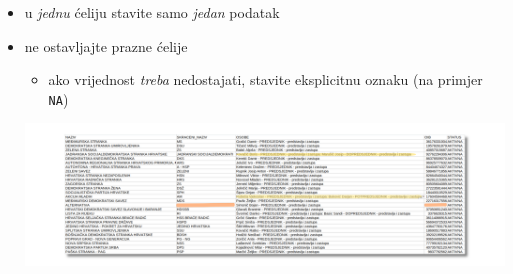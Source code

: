 \documentclass[handout,aspectratio=169]{beamer}
\begin{document}
\begin{frame}
    \begin{itemize}
        \setlength{\itemsep}{2em}

        \item u \textit{jednu} ćeliju stavite samo \textit{jedan} podatak

        \item ne ostavljajte prazne ćelije

            \begin{itemize}
                \item ako vrijednost \textit{treba} nedostajati, stavite
                    eksplicitnu oznaku (na primjer \texttt{NA})

            \end{itemize}

        \vspace{1.5em}

        \includegraphics[scale=.27]{images/messy-politics.png}
    \end{itemize}
\end{frame}
\end{document}

